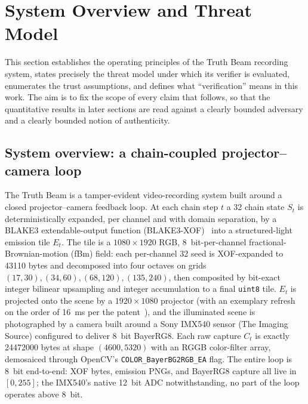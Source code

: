 \section{System Overview and Threat Model}
\label{sec:system_threat}

This section establishes the operating principles of the Truth Beam recording system, states precisely the threat model under which its verifier is evaluated, enumerates the trust assumptions, and defines what ``verification'' means in this work. The aim is to fix the scope of every claim that follows, so that the quantitative results in later sections are read against a clearly bounded adversary and a clearly bounded notion of authenticity.

\subsection{System overview: a chain-coupled projector--camera loop}
\label{sec:system_threat:overview}

The Truth Beam is a tamper-evident video-recording system built around a closed projector--camera feedback loop. At each chain step $t$ a \SI{32}{\byte} chain state $S_t$ is deterministically expanded, per channel and with domain separation, by a BLAKE3 extendable-output function (BLAKE3-XOF)~\cite{blake3} into a structured-light emission tile $E_t$. The tile is a $1080\times1920$ RGB, \SI{8}{bit}-per-channel fractional-Brownian-motion (fBm) field: each per-channel \SI{32}{\byte} seed is XOF-expanded to \num{43110} bytes and decomposed into four octaves on grids $(17,30),(34,60),(68,120),(135,240)$, then composited by bit-exact integer bilinear upsampling and integer accumulation to a final \texttt{uint8} tile. $E_t$ is projected onto the scene by a $1920\times1080$ projector (with an exemplary refresh on the order of \SI{16}{\milli\second} per the patent~\cite{patent2025}), and the illuminated scene is photographed by a camera built around a Sony IMX540 sensor (The Imaging Source) configured to deliver \SI{8}{bit} BayerRG8. Each raw capture $C_t$ is exactly \num{24472000} bytes at shape $(4600,5320)$ with an RGGB color-filter array, demosaiced through OpenCV's \texttt{COLOR\_BayerBG2RGB\_EA} flag. The entire loop is \SI{8}{bit} end-to-end: XOF bytes, emission PNGs, and BayerRG8 capture all live in $[0,255]$; the IMX540's native \SI{12}{bit} ADC notwithstanding, no part of the loop operates above \SI{8}{bit}.


